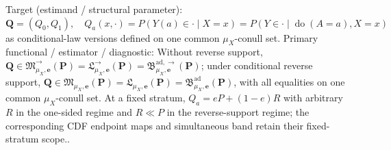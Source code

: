 \documentclass{article}
\begin{document}
Target (estimand / structural parameter): \(\boldsymbol Q=(Q_0,Q_1),\quad Q_a(x,\cdot)=P(Y(a)\in\cdot\mid X=x)=P(Y\in\cdot\mid\operatorname{do}(A=a),X=x)\) as conditional-law versions defined on one common \(\mu_X\)-conull set.
Primary functional / estimator / diagnostic: Without reverse support, \(\boldsymbol Q\in\mathfrak M^{\to}_{\mu_X,\boldsymbol e}(\boldsymbol P)=\mathfrak L^{\to}_{\mu_X,\boldsymbol e}(\boldsymbol P)=\mathfrak B^{\mathrm{ad},\to}_{\mu_X,\boldsymbol e}(\boldsymbol P)\); under conditional reverse support, \(\boldsymbol Q\in\mathfrak M_{\mu_X,\boldsymbol e}(\boldsymbol P)=\mathfrak L_{\mu_X,\boldsymbol e}(\boldsymbol P)=\mathfrak B^{\mathrm{ad}}_{\mu_X,\boldsymbol e}(\boldsymbol P)\), with all equalities on one common \(\mu_X\)-conull set. At a fixed stratum, \(Q_a=eP+(1-e)R\) with arbitrary \(R\) in the one-sided regime and \(R\ll P\) in the reverse-support regime; the corresponding CDF endpoint maps and simultaneous band retain their fixed-stratum scope..
\end{document}
